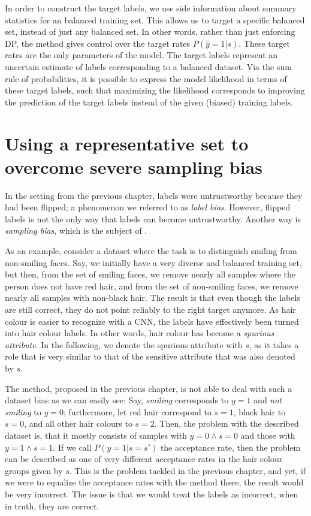 In order to construct the target labels,
we use side information about summary statistics for an balanced training set.
This allows us to target a specific balanced set, instead of just any balanced set.
In other words, rather than just enforcing \ac{DP}, the method gives control over the target rates \(P(\hat{y}=1|s)\).
These target rates are the only parameters of the model.
The target labels represent an uncertain estimate of labels corresponding to a balanced dataset.
Via the sum rule of probabilities, it is possible to express the model likelihood in terms of these target labels,
such that maximizing the likelihood corresponds to improving the prediction of the target labels
instead of the given (biased) training labels.

\section{Using a representative set to overcome severe sampling bias}\label{sec:nifr}
In the setting from the previous chapter,
labels were untrustworthy because they had been flipped;
a phenomenon we referred to as \emph{label bias}.
However, flipped labels is not the only way that labels can become untrustworthy.
Another way is \emph{sampling bias}, which is the subject of .

As an example, consider a dataset where the task is to distinguish smiling from non-smiling faces.
Say, we initially have a very diverse and balanced training set,
but then, from the set of smiling faces, we remove nearly all samples where the person does not have red hair,
and from the set of non-smiling faces, we remove nearly all samples with non-black hair.
The result is that even though the labels are still correct, they do not point reliably to the right target anymore.
As hair colour is easier to recognize with a \ac{CNN}, the labels have effectively been turned into hair colour labels.
In other words, hair colour has become a \emph{spurious attribute}.
In the following, we denote the spurious attribute with \(s\),
as it takes a role that is very similar to that of the sensitive attribute that was also denoted by \(s\).

The method, proposed in the previous chapter,
is not able to deal with such a dataset bias as we can easily see:
Say, \emph{smiling} corresponds to \(y=1\) and \emph{not smiling} to \(y=0\);
furthermore, let red hair correspond to \(s=1\), black hair to \(s=0\), and all other hair colours to \(s=2\).
Then, the problem with the described dataset is, that it mostly consists of samples with \(y=0\wedge s=0\)
and those with \(y=1\wedge s=1\).
If we call \(P(y=1|s=s')\) the acceptance rate,
then the problem can be described as one of very different acceptance rates in the hair colour groups given by \(s\).
This is the problem tackled in the previous chapter,
and yet, if we were to equalize the acceptance rates with the method there,
the result would be very incorrect.
The issue is that we would treat the labels as incorrect, when in truth, they are correct.

